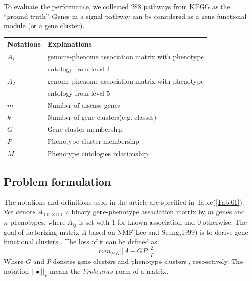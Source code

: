 \documentclass{bmcart}
\begin{document}
To evaluate the performance, we collected 288 pathways from KEGG as the ``ground truth''. Genes in a signal pathway can be considered as a gene functional module (or a gene cluster).
\begin{table}[!t]
\begin{tabular}{ll}
    \hline
    Notations & Explanations\\
    \hline\hline
    $A_1$ & genome-phenome association matrix with phenotype\\
    & ontology from level 4\\
    $A_2$ & genome-phenome association matrix with phenotype\\
    & ontology from level 5\\
    $m$ & Number of disease genes\\
    $k$ & Number of gene clusters(e.g. classes)\\
    $G$ & Gene cluster membership\\
    $P$ & Phenotype cluster membership\\
    $M$ & Phenotype ontologies relationship\\
    \hline
  \end{tabular}
\end{table}

\subsection*{Problem formulation}
The notations and definitions used in the article are specified in Table(\ref{Tab:01}).
We denote $A_{(m \times n)}$ a binary gene-phenotype association matrix by $m$ genes and $n$ phenotypes, where $A_{ij}$ is set with 1 for known association and 0 otherwise. The goal of factorizing matrix $A$ based on NMF(Lee and Seung,1999) is to derive gene functional clusters . The loss of it can be defined as:
\[min _{P,G} ||A-GP||^{2}_{F}\]
Where $G$ and $P$ denotes gene clusters and phenotype clusters , respectively. The notation $||\bullet||_F$ means the $Frobenius$ norm of a matrix.
\end{document}
